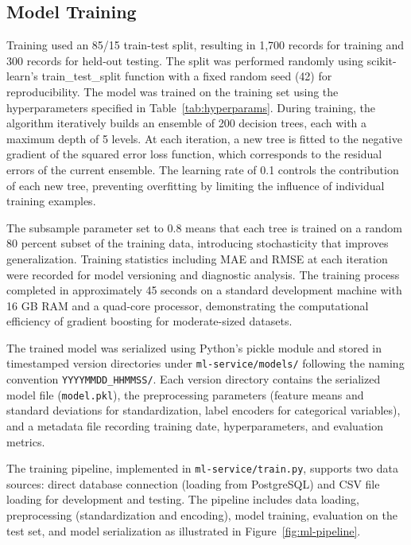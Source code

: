 \documentclass[12pt,a4paper,oneside]{report}
\begin{document}
\subsection{Model Training}
Training used an 85/15 train-test split, resulting in 1,700 records for training and 300 records for held-out testing. The split was performed randomly using scikit-learn's train\_test\_split function with a fixed random seed (42) for reproducibility. The model was trained on the training set using the hyperparameters specified in Table~\ref{tab:hyperparams}. During training, the algorithm iteratively builds an ensemble of 200 decision trees, each with a maximum depth of 5 levels. At each iteration, a new tree is fitted to the negative gradient of the squared error loss function, which corresponds to the residual errors of the current ensemble. The learning rate of 0.1 controls the contribution of each new tree, preventing overfitting by limiting the influence of individual training examples.

The subsample parameter set to 0.8 means that each tree is trained on a random 80 percent subset of the training data, introducing stochasticity that improves generalization. Training statistics including MAE and RMSE at each iteration were recorded for model versioning and diagnostic analysis. The training process completed in approximately 45 seconds on a standard development machine with 16 GB RAM and a quad-core processor, demonstrating the computational efficiency of gradient boosting for moderate-sized datasets.

The trained model was serialized using Python's pickle module and stored in timestamped version directories under \texttt{ml-service/models/} following the naming convention \texttt{YYYYMMDD\_HHMMSS/}. Each version directory contains the serialized model file (\texttt{model.pkl}), the preprocessing parameters (feature means and standard deviations for standardization, label encoders for categorical variables), and a metadata file recording training date, hyperparameters, and evaluation metrics.

The training pipeline, implemented in \texttt{ml-service/train.py}, supports two data sources: direct database connection (loading from PostgreSQL) and CSV file loading for development and testing. The pipeline includes data loading, preprocessing (standardization and encoding), model training, evaluation on the test set, and model serialization as illustrated in Figure~\ref{fig:ml-pipeline}.
\end{document}
